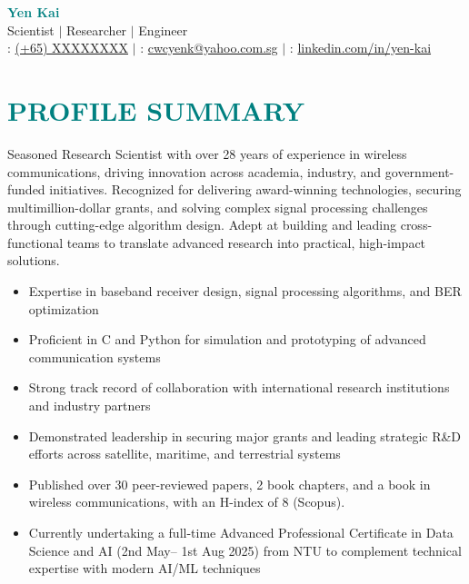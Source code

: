 \documentclass[a4paper, 11pt]{article}
\begin{document}
\begin{center}
	
	\textbf{\Huge \textcolor{teal}{Yen Kai}} \\ \vspace{3pt}
	\Large{Scientist $|$ Researcher $|$ Engineer} \\ \vspace{3pt}
	\small
	\faPhone : \href{tel:XXXXXXXX}{(+65) XXXXXXXX}
	$|$
	\faEnvelope : \href{mailto:cwcyenk@yahoo.com.sg}{cwcyenk@yahoo.com.sg}
	$|$
	\faLinkedinSquare : \href{https://linkedin.com/in/yen-kai}{linkedin.com/in/yen-kai}
	
\end{center}

\section{\textcolor{teal}{\bf{PROFILE SUMMARY}}}

	\vspace{3pt}
	
	Seasoned Research Scientist with over 28 years of experience in wireless communications, driving innovation across academia, industry, and government-funded initiatives. Recognized for delivering award-winning technologies, securing multimillion-dollar grants, and solving complex signal processing challenges through cutting-edge algorithm design. Adept at building and leading cross-functional teams to translate advanced research into practical, high-impact solutions.  
	
	\vspace{2pt}
	
	\begin{itemize}[leftmargin=*, itemsep=-1mm]
		
		\item Expertise in baseband receiver design, signal processing algorithms, and BER optimization
		\item Proficient in C and Python for simulation and prototyping of advanced communication systems
		\item Strong track record of collaboration with international research institutions and industry partners 
		\item Demonstrated leadership in securing major grants and leading strategic R\&D efforts across satellite, maritime, and terrestrial systems 
		\item Published over 30 peer-reviewed papers, 2 book chapters, and a book in wireless communications, with an H-index of 8 (Scopus). 
		\item Currently undertaking a full-time Advanced Professional Certificate in Data Science and AI (2nd May– 1st Aug 2025) from NTU to complement technical expertise with modern AI/ML techniques
		
	\end{itemize}
\end{document}
